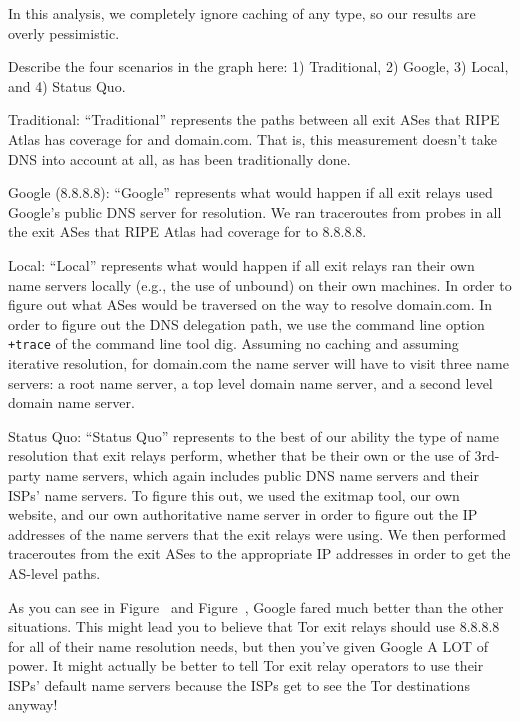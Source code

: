 In this analysis, we completely ignore caching of any type, so our results are overly 
pessimistic. 

Describe the four scenarios in the graph here: 1) Traditional, 2) Google, 3) Local, and 
4) Status Quo.

Traditional: ``Traditional'' represents the paths between all exit ASes that RIPE Atlas 
has coverage for and domain.com. That is, this measurement doesn't take DNS into account 
at all, as has been traditionally done.

Google (8.8.8.8): ``Google'' represents what would happen if all exit relays used 
Google's public DNS server for resolution. We ran traceroutes from probes in all the exit 
ASes that RIPE Atlas had coverage for to 8.8.8.8.

Local: ``Local'' represents what would happen if all exit relays ran their own name 
servers locally (e.g., the use of unbound) on their own machines. In order to figure out 
what ASes would be traversed on the way to resolve domain.com. In order to figure out the 
DNS delegation path, we use the command line option \texttt{+trace} of the
command line tool dig. Assuming no caching and assuming 
iterative resolution, for domain.com the name server will have to visit three name servers:
a root name server, a top level domain name server, and a second level domain name server. 

Status Quo: ``Status Quo'' represents to the best of our ability the type of name resolution 
that exit relays perform, whether that be their own or the use of 3rd-party name servers, 
which again includes public DNS name servers and their ISPs' name servers. To figure this 
out, we used the exitmap tool, our own website, and our own authoritative name server 
in order to figure out the IP addresses of the name servers that the exit relays were 
using. We then performed traceroutes from the exit ASes to the appropriate IP addresses 
in order to get the AS-level paths.


As you can see in Figure~ and
Figure~, 
Google fared much better than the other situations. This might lead you to believe that 
Tor exit relays should use 8.8.8.8 for all of their name resolution needs, but then you've 
given Google A LOT of power. It might actually be better to tell Tor exit relay operators 
to use their ISPs' default name servers because the ISPs get to see the Tor destinations 
anyway!

